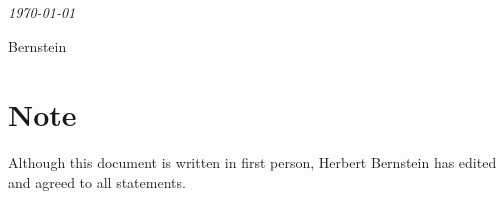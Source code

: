 \documentclass[preprint]{iucr}              %
\numberwithin{equation}{section}
\begin{document}

	\raggedbottom
	\setlength{\parskip}{0pt}
	{\LARGE \emph{\today}} \\
		
	
	\author[b]{Herbert J.}{Bernstein}
	
	
	
	
	
	\maketitle                        %
	\newcommand{\si}[0]{$s_1$}
	\newcommand{\sii}[0]{$s_2$}
	\newcommand{\siii}[0]{$s_3$}
	\newcommand{\siv}[0]{$s_4$}
	\newcommand{\sv}[0]{$s_5$}
	\newcommand{\svi}[0]{$s_6$}
	\newcommand{\Svec} [0] {\{\si, \sii, \siii, \siv, \sv, \svi \}}
	\newcommand{\SvecA} [0] {\{-\si, -\si+\sii, \si+\siii, \si+\sv, \si+\siv, \si+\svi \}}
	
	\newcommand{\OPES}[0]{$E^3toS^6$}
	\newcommand{\OPESS}[0]{$$E^3toS^6$$}
	\newcommand{\MSVI}[0]{$M_{S^{6}}$}
	\newcommand{\MEIII}[0]{$M_{E^{3}}$}
	\newcommand{\Plus}[0]{$\textfrak{P}$}	
	\newcommand{\Minus}[0]{$\textfrak{M}$}
	
	\newcommand{\ci}[0]{$c_1$}
	\newcommand{\cii}[0]{$c_2$}
	\newcommand{\ciii}[0]{$c_3$}
	

	\singlespacing
	
	\section{Note}
	
	Although this document is written in first person, Herbert
	Bernstein has edited and agreed to all statements.
\end{document}
